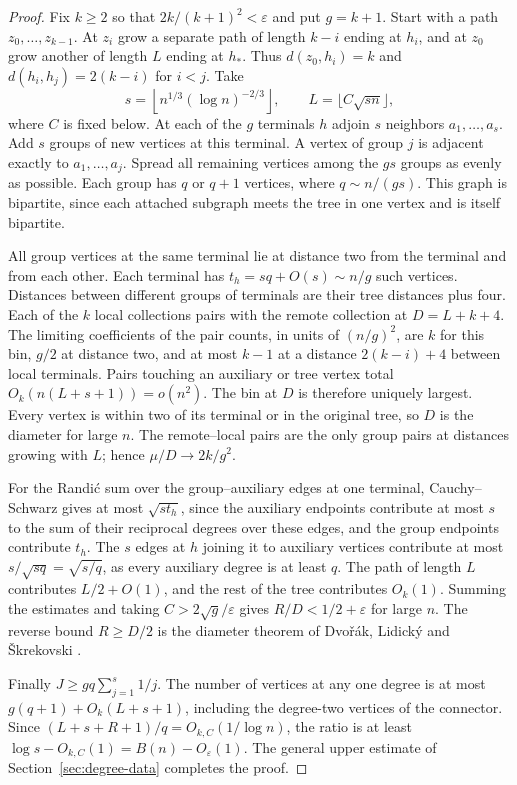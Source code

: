 \documentclass[11pt,a4paper]{article}
\theoremstyle{remark}\newtheorem*{remark}{Remark}
\begin{document}
\begin{proof}
Fix $k\ge2$ so that $2k/(k+1)^2<\varepsilon$ and put $g=k+1$. Start with a path $z_0,\ldots,z_{k-1}$. At $z_i$ grow a separate path of length $k-i$ ending at $h_i$, and at $z_0$ grow another of length $L$ ending at $h_*$. Thus $d(z_0,h_i)=k$ and $d(h_i,h_j)=2(k-i)$ for $i<j$. Take
\[
 s=\left\lfloor n^{1/3}(\log n)^{-2/3}\right\rfloor,\qquad
 L=\lfloor C\sqrt{sn}\rfloor,
\]
where $C$ is fixed below. At each of the $g$ terminals $h$ adjoin $s$ neighbors $a_1,\ldots,a_s$. Add $s$ groups of new vertices at this terminal. A vertex of group $j$ is adjacent exactly to $a_1,\ldots,a_j$. Spread all remaining vertices among the $gs$ groups as evenly as possible. Each group has $q$ or $q+1$ vertices, where $q\sim n/(gs)$. This graph is bipartite, since each attached subgraph meets the tree in one vertex and is itself bipartite.

All group vertices at the same terminal lie at distance two from the terminal and from each other. Each terminal has $t_h=sq+O(s)\sim n/g$ such vertices. Distances between different groups of terminals are their tree distances plus four. Each of the $k$ local collections pairs with the remote collection at $D=L+k+4$. The limiting coefficients of the pair counts, in units of $(n/g)^2$, are $k$ for this bin, $g/2$ at distance two, and at most $k-1$ at a distance $2(k-i)+4$ between local terminals. Pairs touching an auxiliary or tree vertex total $O_k(n(L+s+1))=o(n^2)$. The bin at $D$ is therefore uniquely largest. Every vertex is within two of its terminal or in the original tree, so $D$ is the diameter for large $n$. The remote--local pairs are the only group pairs at distances growing with $L$; hence $\mu/D\to2k/g^2$.

For the Randi\'c sum over the group--auxiliary edges at one terminal, Cauchy--Schwarz gives at most $\sqrt{s t_h}$, since the auxiliary endpoints contribute at most $s$ to the sum of their reciprocal degrees over these edges, and the group endpoints contribute $t_h$. The $s$ edges at $h$ joining it to auxiliary vertices contribute at most $s/\sqrt{sq}=\sqrt{s/q}$, as every auxiliary degree is at least $q$. The path of length $L$ contributes $L/2+O(1)$, and the rest of the tree contributes $O_k(1)$. Summing the estimates and taking $C>2\sqrt g/\varepsilon$ gives $R/D<1/2+\varepsilon$ for large $n$. The reverse bound $R\ge D/2$ is the diameter theorem of Dvo\v{r}\'ak, Lidick\'y and \v{S}krekovski \cite{dls}.

Finally $J\ge gq\sum_{j=1}^s1/j$. The number of vertices at any one degree is at most $g(q+1)+O_k(L+s+1)$, including the degree-two vertices of the connector. Since $(L+s+R+1)/q=O_{k,C}(1/\log n)$, the ratio is at least $\log s-O_{k,C}(1)=B(n)-O_{\varepsilon}(1)$. The general upper estimate of Section~\ref{sec:degree-data} completes the proof.
\end{proof}
\end{document}
